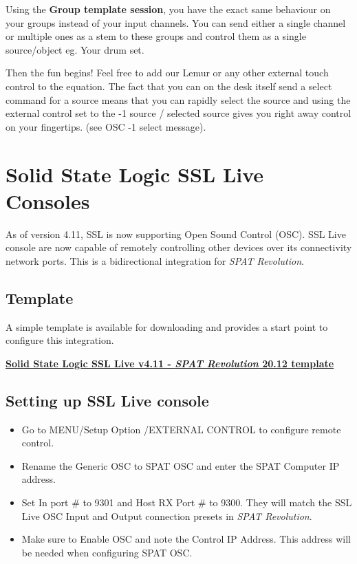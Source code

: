 \documentclass[
  letterpaper,
  DIV=11,
  numbers=noendperiod]{scrreport}
\begin{document}
Using the \textbf{Group template session}, you have the exact same
behaviour on your groups instead of your input channels. You can send
either a single channel or multiple ones as a stem to these groups and
control them as a single source/object eg. Your drum set.

Then the fun begins! Feel free to add our Lemur or any other external
touch control to the equation. The fact that you can on the desk itself
send a select command for a source means that you can rapidly select the
source and using the external control set to the -1 source / selected
source gives you right away control on your fingertips. (see OSC -1
select message).

\hypertarget{solid-state-logic-ssl-live-consoles}{%
\chapter{Solid State Logic SSL Live
Consoles}\label{solid-state-logic-ssl-live-consoles}}

As of version 4.11, SSL is now supporting Open Sound Control (OSC). SSL
Live console are now capable of remotely controlling other devices over
its connectivity network ports. This is a bidirectional integration for
\emph{SPAT Revolution}.

\hypertarget{template}{%
\section{Template}\label{template}}

A simple template is available for downloading and provides a start
point to configure this integration.

\textbf{\href{https://public.3.basecamp.com/p/CSWr2SGggU6bbdZfTysp6LXj}{Solid
State Logic SSL Live v4.11 - \emph{SPAT Revolution} 20.12 template}}

\hypertarget{setting-up-ssl-live-console}{%
\section{Setting up SSL Live
console}\label{setting-up-ssl-live-console}}

\begin{itemize}
\item
  Go to MENU/Setup Option /EXTERNAL CONTROL to configure remote control.
\item
  Rename the Generic OSC to SPAT OSC and enter the SPAT Computer IP
  address.
\item
  Set In port \# to 9301 and Host RX Port \# to 9300. They will match
  the SSL Live OSC Input and Output connection presets in \emph{SPAT
  Revolution}.
\item
  Make sure to Enable OSC and note the Control IP Address. This address
  will be needed when configuring SPAT OSC.
\end{itemize}
\end{document}
